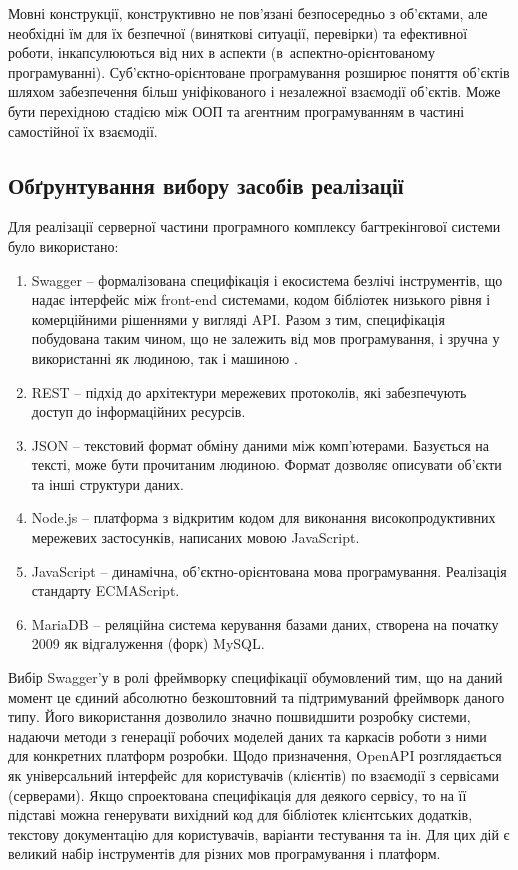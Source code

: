 \documentclass[../main.tex]{subfiles}
\begin{document}
Мовні конструкції, конструктивно не пов'язані безпосередньо з об'єктами, але необхідні їм для їх безпечної (виняткові ситуації, перевірки) та ефективної роботи, інкапсулюються від них в аспекти (в~аспектно-\linebreak[0]орієнтованому програмуванні). Суб'єктно-орієнтоване програмування розширює поняття об'єктів шляхом забезпечення більш уніфікованого і незалежної взаємодії об'єктів. Може бути перехідною стадією між ООП та агентним програмуванням в частині самостійної їх взаємодії.

\subsection{Обґрунтування вибору засобів реалізації}

Для реалізації серверної частини програмного комплексу багтрекінгової системи було використано:
\begin{enumerate}
	\item Swagger -- формалізована специфікація і екосистема безлічі інструментів, що надає інтерфейс між front-end системами, кодом бібліотек низького рівня і комерційними рішеннями у вигляді API. Разом з тим, специфікація побудована таким чином, що не залежить від мов програмування, і зручна у використанні як людиною, так і машиною \cite{swagger}.
	\item REST -- підхід до архітектури мережевих протоколів, які забезпечують доступ до інформаційних ресурсів.
	\item JSON -- текстовий формат обміну даними між комп'ютерами. Базується на тексті, може бути прочитаним людиною. Формат дозволяє описувати об'єкти та інші структури даних.
	\item Node.js -- платформа з відкритим кодом для виконання високопродуктивних мережевих застосунків, написаних мовою JavaScript.
	\item JavaScript -- динамічна, об'єктно-орієнтована мова програмування. Реалізація стандарту ECMAScript.
	\item MariaDB -- реляційна система керування базами даних, створена на початку 2009 як відгалуження (форк) MySQL.
\end{enumerate}

Вибір Swagger'у в ролі фреймворку специфікації обумовлений тим, що на даний момент це єдиний абсолютно безкоштовний та підтримуваний фреймворк даного типу. Його використання дозволило значно пошвидшити розробку системи, надаючи методи з генерації робочих моделей даних та каркасів роботи з ними для конкретних платформ розробки. Щодо призначення, OpenAPI розглядається як універсальний інтерфейс для користувачів (клієнтів) по взаємодії з сервісами (серверами). Якщо спроектована специфікація для деякого сервісу, то на її підставі можна генерувати вихідний код для бібліотек клієнтських додатків, текстову документацію для користувачів, варіанти тестування та ін. Для цих дій є великий набір інструментів для різних мов програмування і платформ.
\end{document}
